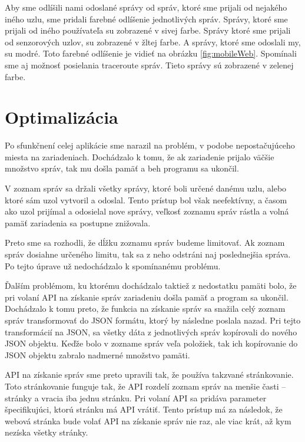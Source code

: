 \documentclass[slovak,master]{diploma}
\begin{document}
Aby sme odlíšili nami odoslané správy od správ, ktoré sme prijali od nejakého iného uzlu, sme pridali farebné odlíšenie jednotlivých správ. Správy, ktoré sme 
prijali od iného používateľa su zobrazené v sivej farbe. Správy ktoré sme prijali od senzorových uzlov, su zobrazené v žltej farbe. A správy, ktoré sme odoslali 
my, su modré. Toto farebné odlíšenie je vidieť na obrázku \ref{fig:mobileWeb}. Spomínali sme aj možnosť posielania traceroute správ. Tieto správy sú zobrazené v zelenej farbe.


\section{Optimalizácia}
Po sfunkčnení celej aplikácie sme narazil na problém, v podobe nepostačujúceho miesta na zariadeniach. Dochádzalo k tomu, že ak zariadenie prijalo 
väčšie množstvo správ, tak mu došla pamäť a beh programu sa ukončil.

V zoznam správ sa držali všetky správy, ktoré boli určené danému uzlu, alebo ktoré sám uzol vytvoril a odoslal. Tento prístup bol však neefektívny, a časom ako 
uzol prijímal a odosielal nove správy, veľkosť zoznamu správ rástla a volná pamäť zariadenia sa postupne znižovala.

Preto sme sa rozhodli, že dĺžku zoznamu správ budeme limitovať. Ak zoznam správ dosiahne určeného limitu, tak sa z neho odstráni naj poslednejšia správa.
Po tejto úprave už nedochádzalo k spomínanému problému.

Ďalším problémom, ku ktorému dochádzalo taktiež z nedostatku pamäti bolo, že pri volaní API na získanie správ zariadeniu došla pamäť a program sa ukončil.
Dochádzalo k tomu preto, že funkcia na získanie správ sa snažila celý zoznam správ transformovať do JSON formátu, ktorý by následne poslala nazad. Pri tejto transformácií 
na JSON, sa všetky dáta z jednotlivých správ kopírovali do nového JSON objektu. Keďže bolo v zozname správ veľa položiek, tak ich kopírovanie do JSON objektu zabralo 
nadmerné množstvo pamäti.

API na získanie správ sme preto upravili tak, že používa takzvané stránkovanie. Toto stránkovanie funguje tak, že API rozdelí zoznam správ na menšie časti -- stránky a 
vracia iba jednu stránku. Pri volaní API sa pridáva parameter špecifikujúci, ktorú stránku má API vrátiť. Tento prístup má za následok, že 
webová stránka bude volať API na získanie správ nie raz, ale viac krát, až kym nezíska všetky stránky.
\end{document}
